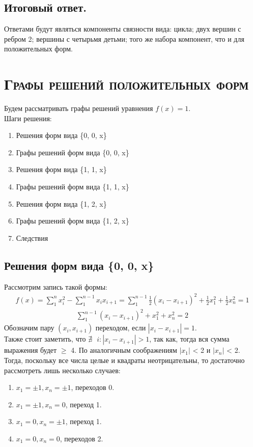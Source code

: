 \documentclass[12pt, a4paper]{article}
\begin{document}
{        \subsection{\large{Итоговый ответ.}}
            Ответами будут являться компоненты связности вида: цикла; двух вершин с ребром 2; вершины с четырьмя детьми; того же набора компонент, что и для положительных форм.
    \pagebreak

    \section{\textsc{Графы решений положительных форм}}
        Будем рассматривать графы решений уравнения $f(x) = 1$.\\
        Шаги решения:\\
        \begin{enumerate}
            \item Решения форм вида \{0, 0, x\}
            \item Графы решений форм вида \{0, 0, x\}
            \item Решения форм вида \{1, 1, x\}
            \item Графы решений форм вида \{1, 1, x\}
            \item Решения форм вида \{1, 2, x\}
            \item Графы решений форм вида \{1, 2, x\}
            \item Следствия
        \end{enumerate}
        
        \subsection{\large{Решения форм вида \{0, 0, x\}}}
            Рассмотрим запись такой формы:
            \begin{gather*}
            f(x)=\sum_1^n x_i^2 - \sum_1^{n-1} x_ix_{i+1} = \sum_1^{n-1} \frac{1}{2}(x_i-x_{i+1})^2 +\frac{1}{2}x_1^2 + \frac{1}{2}x_n^2 = 1
            \end{gather*}
            \begin{gather*}
            \sum_1^{n-1} (x_i-x_{i+1})^2 + x_1^2 + x_n^2 = 2
            \end{gather*}
            Обозначим пару $(x_i, x_{i+1})$ переходом, если $|x_i-x_{i+1}| = 1$.\\
            Также стоит заметить, что $\nexists \text{ } i : |x_i-x_{i+1}| > 1$, так как, тогда вся сумма выражения будет $\geq$ 4. По аналогичным соображениям $|x_1|$ < 2 и $|x_n|$ < 2. Тогда, поскольку все числа целые и квадраты неотрицательны, то достаточно рассмотреть лишь несколько случаев:
            \begin{enumerate}
                \item $x_1 = \pm 1, x_n=\pm 1$, переходов 0.
                \item $x_1 = \pm1, x_n=0$, переход 1.
                \item $x_1 = 0, x_n=\pm 1$, переход 1.
                \item $x_1 = 0, x_n = 0$, переходов 2.
            \end{enumerate}
}
\end{document}
